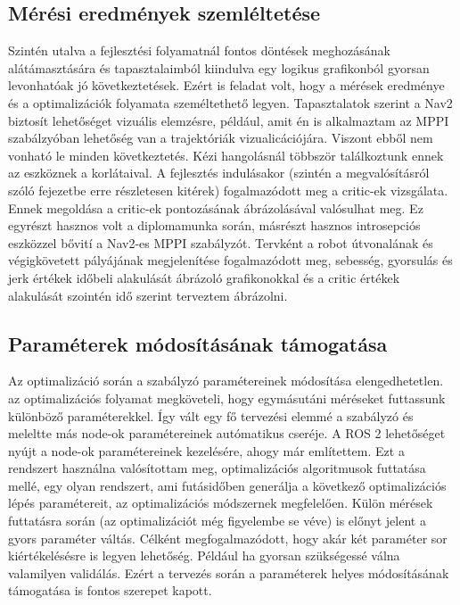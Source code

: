 \subsection{Mérési eredmények szemléltetése}
Szintén utalva a fejlesztési folyamatnál fontos döntések meghozásának alátámasztására és tapasztalaimból kiindulva egy logikus grafikonból gyorsan levonhatóak jó következtetések. Ezért is feladat volt, hogy a mérések eredménye és a optimalizációk folyamata személtethető legyen. Tapasztalatok szerint a Nav2 biztosít lehetőséget vizuális elemzésre, például, amit én is alkalmaztam az MPPI szabálzyóban lehetőség van a trajektóriák vizualicációjára. Viszont ebből nem vonható le minden következtetés. Kézi hangolásnál többször találkoztunk ennek az eszköznek a korlátaival. A fejlesztés indulásakor (szintén a megvalósításról szóló fejezetbe erre részletesen kitérek) fogalmazódott meg a critic-ek vizsgálata. Ennek megoldása a critic-ek pontozásának ábrázolásával valósulhat meg. Ez egyrészt hasznos volt a diplomamunka során, másrészt hasznos introsepciós eszközzel bővití a Nav2-es MPPI szabályzót. Tervként a robot útvonalának és végigkövetett pályájának megjelenítése fogalmazódott meg, sebesség, gyorsulás és jerk értékek időbeli alakulását ábrázoló grafikonokkal és a critic értékek alakulását szointén idő szerint terveztem ábrázolni.

\subsection{Paraméterek módosításának támogatása}
Az optimalizáció során a szabályzó paramétereinek módosítása elengedhetetlen. az optimalizációs folyamat megköveteli, hogy egymásutáni méréseket futtassunk különböző paraméterekkel. Így vált egy fő tervezési elemmé a szabályzó és meleltte más node-ok paramétereinek autómatikus cseréje. A ROS 2 lehetőséget nyújt a node-ok paramétereinek kezelésére, ahogy már említettem. Ezt a rendszert használna valósítottam meg, optimalizációs algoritmusok futtatása mellé, egy olyan rendszert, ami futásidőben generálja a következő optimalizációs lépés paramétereit, az optimalizációs módszernek megfelelően. Külön mérések futtatásra során (az optimalizációt még figyelembe se véve) is előnyt jelent a gyors paraméter váltás. Célként megfogalmazódott, hogy akár két paraméter sor kiértékelésésre is legyen lehetőség. Például ha gyorsan szükségessé válna valamilyen validálás. Ezért a tervezés során a paraméterek helyes módosításának támogatása is fontos szerepet kapott.

